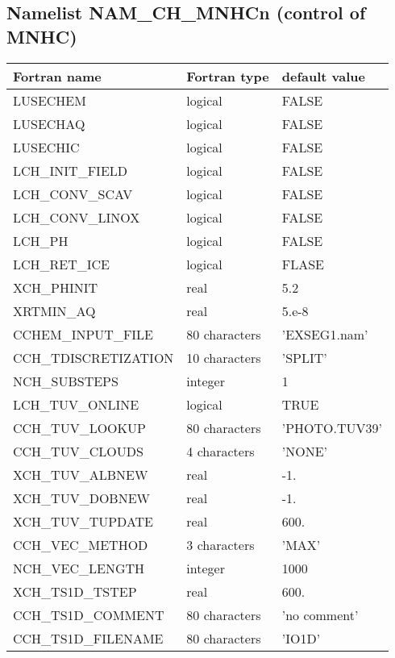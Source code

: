 \newpage

\subsection{Namelist NAM\_CH\_MNHCn (control of MNHC)}
\label{ss:chem}

\begin{center}
\begin{tabular} {|l|l|l|}
\hline
Fortran name & Fortran type & default value \\
\hline
LUSECHEM                & logical       & FALSE      \\
LUSECHAQ 		&logical 	&FALSE\\
LUSECHIC 		&logical 	&FALSE\\
LCH\_INIT\_FIELD 		&logical 	&FALSE\\
LCH\_CONV\_SCAV 		&logical 	&FALSE\\
LCH\_CONV\_LINOX 		&logical 	&FALSE\\
LCH\_PH			&logical	&FALSE\\
LCH\_RET\_ICE		&logical	&FLASE\\
XCH\_PHINIT		&real		&5.2\\
XRTMIN\_AQ		&real		&5.e-8\\
CCHEM\_INPUT\_FILE 	&80 characters 	&'EXSEG1.nam'\\
CCH\_TDISCRETIZATION 	&10 characters 	&'SPLIT'\\
NCH\_SUBSTEPS 		&integer 	&1\\
LCH\_TUV\_ONLINE 		&logical 	&TRUE\\
CCH\_TUV\_LOOKUP 		&80 characters 	&'PHOTO.TUV39'\\
CCH\_TUV\_CLOUDS 		&4 characters 	&'NONE'\\
XCH\_TUV\_ALBNEW 		&real 		&-1.\\
XCH\_TUV\_DOBNEW 		&real 		&-1.\\
XCH\_TUV\_TUPDATE 	&real 		&600.\\
CCH\_VEC\_METHOD 		&3 characters 	&'MAX'\\
NCH\_VEC\_LENGTH 		&integer 	&1000\\
XCH\_TS1D\_TSTEP 		&real 		&600.\\
CCH\_TS1D\_COMMENT 	&80 characters 	&'no comment'\\
CCH\_TS1D\_FILENAME 	&80 characters 	&'IO1D'\\
\hline
\end{tabular}
\end{center}

